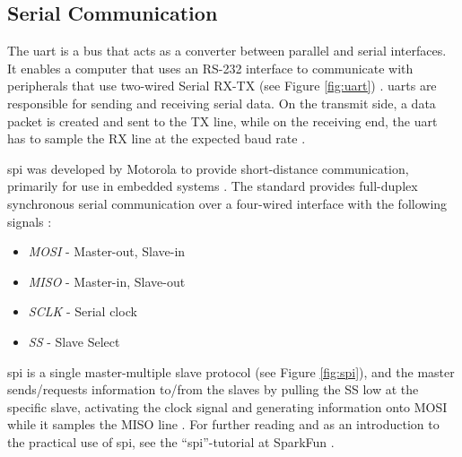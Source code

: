 \subsection{Serial Communication}
\label{sec:uart}
The \acrfull{uart} is a bus that acts as a converter between parallel and serial interfaces. It enables a computer that uses an RS-232 interface to communicate with peripherals that use two-wired Serial RX-TX (see Figure \ref{fig:uart}) \cite{whatisuart}.
\acrshort{uart}s are responsible for sending and receiving serial data. On the transmit side, a data packet is created and sent to the TX line, while on the receiving end, the \acrshort{uart} has to sample the RX line at the expected baud rate \cite{sparkfunuart}.

\newpage
{}
\label{sec:spi}
\acrfull{spi} was developed by Motorola to provide short-distance communication, primarily for use in embedded systems \cite{corelis2016}. The standard provides full-duplex synchronous serial communication over a four-wired interface with the following signals \cite{epanorama2011}:
\begin{itemize}
    \item \textit{MOSI} - Master-out, Slave-in
    \item \textit{MISO} - Master-in, Slave-out
    \item \textit{SCLK} - Serial clock
    \item \textit{SS} - Slave Select
\end{itemize}
\acrshort{spi} is a single master-multiple slave protocol (see Figure \ref{fig:spi}), and the master sends/requests information to/from the slaves by pulling the SS low at the specific slave, activating the clock signal and generating information onto MOSI while it samples the MISO line \cite{byteparadigm}. For further reading and as an introduction to the practical use of \acrshort{spi}, see the ``\acrfull{spi}''-tutorial at SparkFun \cite{sparkfunspi}.